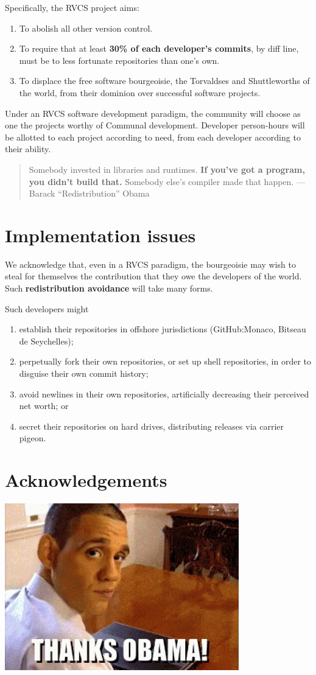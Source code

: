 \documentclass[10pt]{article}
\begin{document}
Specifically, the RVCS project aims:
\begin{enumerate}
\item To abolish all other version control.
\item To require that at least \textbf{30\% of each developer's commits}, by
diff line, must be to less fortunate repositories than one's own.
\item To displace the free software bourgeoisie, the Torvaldses and
Shuttleworths of the world, from their dominion over successful software
projects.
\end{enumerate}

Under an RVCS software development paradigm, the community will choose as one
the projects worthy of Communal development. Developer person-hours will be
allotted to each project according to need, from each developer according to
their ability.


\begin{quote}
Somebody invested in libraries and runtimes. \textbf{If you've got a program,
you didn't build that.} Somebody else's compiler made that happen.%
\hfill ---Barack ``Redistribution'' Obama
\end{quote}

\section{Implementation issues}

We acknowledge that, even in a RVCS paradigm, the bourgeoisie may wish to steal
for themselves the contribution that they owe the developers of the world. Such
\textbf{redistribution avoidance} will take many forms.

Such developers might 
\begin{enumerate}
\item establish their repositories in offshore jurisdictions (GitHub:Monaco,
Bitseau de Seychelles);
\item perpetually fork their own repositories, or set up shell repositories, in
order to disguise their own commit history;
\item avoid newlines in their own repositories, artificially decreasing their
perceived net worth; or
\item secret their repositories on hard drives, distributing releases via
carrier pigeon.
\end{enumerate}

\section*{Acknowledgements}
\includegraphics[width=4in]{thanks.png}

%
\end{document}
